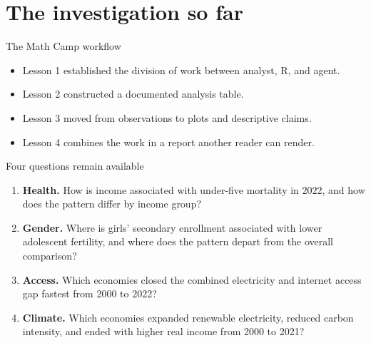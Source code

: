 \section{The investigation so far}

\begin{frame}{The Math Camp workflow}
\centering
{}
\vspace{0.65cm}
\begin{itemize}
\item Lesson 1 established the division of work between analyst, R, and agent.
\item Lesson 2 constructed a documented analysis table.
\item Lesson 3 moved from observations to plots and descriptive claims.
\item Lesson 4 combines the work in a report another reader can render.
\end{itemize}
\end{frame}

\begin{frame}{Four questions remain available}
\small
\begin{enumerate}
\item \textbf{Health.} How is income associated with under-five mortality in 2022, and how does the pattern differ by income group?
\item \textbf{Gender.} Where is girls' secondary enrollment associated with lower adolescent fertility, and where does the pattern depart from the overall comparison?
\item \textbf{Access.} Which economies closed the combined electricity and internet access gap fastest from 2000 to 2022?
\item \textbf{Climate.} Which economies expanded renewable electricity, reduced carbon intensity, and ended with higher real income from 2000 to 2021?
\end{enumerate}
\end{frame}

